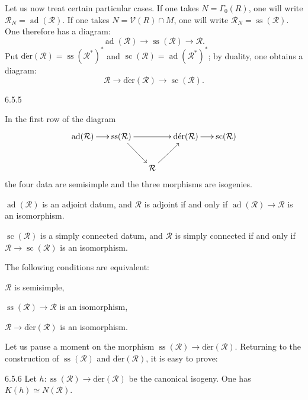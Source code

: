 Let us now treat certain particular cases. If one takes $N=\Gamma_0(R)$, one will write $\mathcal R_N=\operatorname{ad}(\mathcal R)$. If one takes $N=\mathcal V(R)\cap M$, one will write $\mathcal R_N=\operatorname{ss}(\mathcal R)$. One therefore has a diagram:
\[
\operatorname{ad}(\mathcal R)\to\operatorname{ss}(\mathcal R)\to\mathcal R.
\]
Put $\operatorname{d\acute er}(\mathcal R)=\operatorname{ss}(\mathcal R^*)^*$ and $\operatorname{sc}(\mathcal R)=\operatorname{ad}(\mathcal R^*)^*$; by duality, one obtains a diagram:
\[
\mathcal R\to\operatorname{d\acute er}(\mathcal R)\to\operatorname{sc}(\mathcal R).
\]
\begin{proposition}{6.5.5}\label{XXI.6.5.5}
\begin{enumeratei}
\item In the first row of the diagram
\[
\xymatrix@C=1.5em{
\operatorname{ad}(\mathcal R)\ar[r]&\operatorname{ss}(\mathcal R)\ar[rr]\ar[dr]&&\operatorname{d\acute er}(\mathcal R)\ar[r]&\operatorname{sc}(\mathcal R)\\
&&\mathcal R\ar[ur]&&
}
\]
the four data are semisimple and the three morphisms are isogenies.
\item $\operatorname{ad}(\mathcal R)$ is an adjoint datum, and $\mathcal R$ is adjoint if and only if $\operatorname{ad}(\mathcal R)\to\mathcal R$ is an isomorphism.
\item $\operatorname{sc}(\mathcal R)$ is a simply connected datum, and $\mathcal R$ is simply connected if and only if $\mathcal R\to\operatorname{sc}(\mathcal R)$ is an isomorphism.
\item The following conditions are equivalent:
\begin{enumeratea}
\item $\mathcal R$ is semisimple,
\item $\operatorname{ss}(\mathcal R)\to\mathcal R$ is an isomorphism,
\item $\mathcal R\to\operatorname{d\acute er}(\mathcal R)$ is an isomorphism.
\end{enumeratea}
\end{enumeratei}
\end{proposition}
Let us pause a moment on the morphism $\operatorname{ss}(\mathcal R)\to\operatorname{d\acute er}(\mathcal R)$. Returning to the construction of $\operatorname{ss}(\mathcal R)$ and $\operatorname{d\acute er}(\mathcal R)$, it is easy to prove:
\begin{lemma}{6.5.6}\label{XXI.6.5.6}
Let $h:\operatorname{ss}(\mathcal R)\to\operatorname{d\acute er}(\mathcal R)$ be the canonical isogeny. One has $K(h)\simeq N(\mathcal R)$.
\end{lemma}


